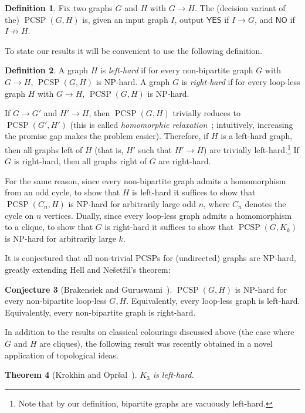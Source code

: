 \documentclass[11pt,a4paper]{scrartcl}
\newtheorem{theorem}{Theorem}
\numberwithin{theorem}{section}
\theoremstyle{definition}
\newtheorem{definition}[theorem]{Definition}
\newtheorem{conjecture}[theorem]{Conjecture}
\DeclareMathOperator{\PCSP}{PCSP}
\begin{document}
\begin{definition}
  Fix two graphs $G$ and $H$ with $G\to H$. The (decision variant of the) $\PCSP(G,H)$ is, given an
  input graph $I$, output $\textsf{YES}$ if $I\to G$, and $\textsf{NO}$ if $I\not\to H$.
\end{definition}

To state our results it will be convenient to use the following definition.

\begin{definition}
	A graph $H$ is \emph{left-hard} if for every non-bipartite graph $G$ with $G \to H$, $\PCSP(G,H)$ is NP-hard.
	A graph $G$ is \emph{right-hard} if for every loop-less graph $H$ with $G \to H$, $\PCSP(G,H)$ is NP-hard.
\end{definition}
If $G \to G'$ and $H' \to H$, then $\PCSP(G,H)$ trivially reduces to  $\PCSP(G',H')$
(this is called \emph{homomorphic relaxation}~\cite{BulinKO18}; intuitively, {increasing} the promise gap makes the problem {easier}).
Therefore, if $H$ is a left-hard graph, then all graphs left of $H$ (that is,
$H'$ such that $H' \to H$) are trivially left-hard.\footnote{Note that by our
definition, bipartite graphs are vacuously left-hard.}
If $G$ is right-hard, then all graphs right of $G$ are right-hard.

For the same reason, since every non-bipartite graph admits a homomorphism from
an odd cycle, to show that $H$ is left-hard it suffices to show that
$\PCSP(C_n,H)$ is NP-hard for arbitrarily large odd $n$, where $C_n$ denotes the
cycle on $n$ vertices.
Dually, since every loop-less graph admits a homomorphism to a clique, to show that $G$ is right-hard it suffices to show that $\PCSP(G,K_k)$ is NP-hard for arbitrarily large $k$.

It is conjectured that all non-trivial PCSPs for (undirected) graphs are NP-hard, greatly extending Hell and  Ne\v{s}et\v{r}il's theorem:

\begin{conjecture}[Brakensiek and Guruswami~\cite{Brakensiek18:soda}]\label{conj:main}
	$\PCSP(G,H)$ is NP-hard for every non-bipartite loop-less $G,H$.
	Equivalently, every loop-less graph is left-hard.
	Equivalently, every non-bipartite graph is right-hard.
\end{conjecture}

In addition to the results on classical colourings discussed above (the case where $G$ and $H$ are cliques),
the following result was recently obtained in a novel application of topological ideas.
\begin{theorem}[Krokhin and Opr\v{s}al~\cite{KrokhinO19}]\label{thm:K3}
	$K_3$ is left-hard.
\end{theorem}
	
\end{document}
